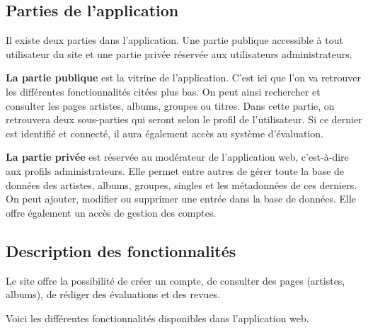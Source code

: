     \subsection{Parties de l'application}

        \begin{paragraphe}
            Il existe deux parties dans l'application. Une partie publique accessible à tout utilisateur du site et une partie
            privée réservée aux utilisateurs administrateurs.
        \end{paragraphe}

        \begin{paragraphe}
            \textbf{La partie publique} est la vitrine de l'application. C'est ici que l'on
            va retrouver les différentes fonctionnalités citées plus bas. On peut
            ainsi rechercher et consulter les pages artistes, albums, groupes ou titres.
            Dans cette partie, on retrouvera deux sous-parties qui seront selon le profil de
            l'utilisateur.
            Si ce dernier est identifié et connecté, il aura également accès au système d'évaluation.
        \end{paragraphe}

        \begin{paragraphe}
            \textbf{La partie privée} est réservée au modérateur de l'application web, c'est-à-dire 
            aux profils administrateurs.
            Elle permet entre autres de gérer toute la base de données des artistes,
            albums, groupes, singles et les métadonnées de ces derniers. On peut ajouter, modifier
            ou supprimer une entrée dans la base de données.
            Elle offre également un accès de gestion des comptes.
        \end{paragraphe}

    \subsection{Description des fonctionnalités}

        \begin{paragraphe}
            Le site offre la possibilité de créer un compte, de consulter des pages
            (artistes, albums), de rédiger des évaluations et des revues.
        \end{paragraphe}

        \begin{paragraphe}
            Voici les différentes fonctionnalités disponibles dans l'application web.
        \end{paragraphe}

